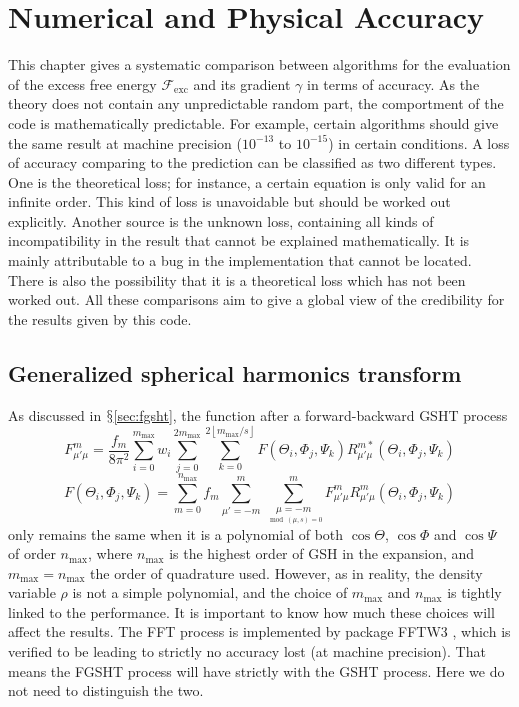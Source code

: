 
\chapter{Numerical and Physical Accuracy\label{chpt:accuracy}}

This chapter gives a systematic comparison between algorithms for
the evaluation of the excess free energy $\mathcal{F}_{\mathrm{exc}}$
and its gradient $\gamma$ in terms of accuracy. As the theory does
not contain any unpredictable random part, the comportment of the
code is mathematically predictable. For example, certain algorithms
should give the same result at machine precision ($10^{-13}$ to $10^{-15}$)
in certain conditions. A loss of accuracy comparing to the prediction
can be classified as two different types. One is the theoretical loss;
for instance, a certain equation is only valid for an infinite order.
This kind of loss is unavoidable but should be worked out explicitly.
Another source is the unknown loss, containing all kinds of incompatibility
in the result that cannot be explained mathematically. It is mainly attributable to a bug in the implementation that cannot be located. There is also the possibility that it is a theoretical loss which has not been worked out. All these comparisons aim to give a global view of the credibility for the results given by this code.

\section{Generalized spherical harmonics transform\label{sec:gsh-imp}}

As discussed in $\mathsection$\ref{sec:fgsht}, the function after
a forward-backward \acs{GSHT} process 
\begin{equation}
F_{\mu'\mu}^{m}=\frac{f_{m}}{8\pi^{2}}\sum_{i=0}^{m_{\mathrm{max}}}w_{i}\sum_{j=0}^{2m_{\mathrm{max}}}\sum_{k=0}^{2\left\lfloor m_{\mathrm{max}}/s\right\rfloor }F(\Theta_{i},\Phi_{j},\Psi_{k})R_{\mu'\mu}^{m*}(\Theta_{i},\Phi_{j},\Psi_{k})
\end{equation}
\begin{equation}
F(\Theta_{i},\Phi_{j},\Psi_{k})=\sum_{m=0}^{n_{\mathrm{max}}}f_{m}\sum_{\mu'=-m}^{m}\sum_{\underset{\mod(\mu,s)=0}{\mu=-m}}^{m}F_{\mu'\mu}^{m}R_{\mu'\mu}^{m}(\Theta_{i},\Phi_{j},\Psi_{k})
\end{equation}
only remains the same when it is a polynomial of both $\cos\Theta$,
$\cos\Phi$ and $\cos\Psi$ of order $n_{\max}$, where $n_{\max}$
is the highest order of \acs{GSH} in the expansion, and $m_{\max}=n_{\max}$
the order of quadrature used. However, as in reality, the density
variable $\rho$ is not a simple polynomial, and the choice of $m_{\max}$
and $n_{\max}$ is tightly linked to the performance. It is important
to know how much these choices will affect the results. The \acs{FFT}
process is implemented by package FFTW3 \citep{FFTW3}, which is verified
to be leading to strictly no accuracy lost (at machine precision).
That means the \acs{FGSHT} process will have strictly with the \acs{GSHT} %
process. Here we do not need to distinguish the two.

